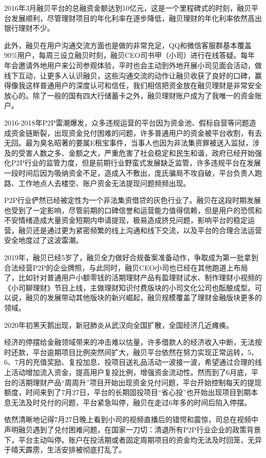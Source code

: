 \documentclass[
]{book}
\begin{document}
2016年3月融贝平台的总融资金额达到10亿元，这是一个里程碑式的时刻，融贝平台发展顺利，尽管理财项目的年化利率在逐步降低，融贝理财的年化利率依然高出银行理财不少。

此外，融贝在用户沟通交流方面也是做的非常充足，QQ和微信客服群基本覆盖90\%用户，每周三设立融贝时刻，融贝CEO司书甲（小司）进行在线答疑。每年年会邀请外地用户来公司参观体验，平时也会主动到外地开展小司见面会活动，做线下互动，让更多人认识融贝，这些沟通交流的动作让融贝收获了良好的口碑，赢得像我这样普通用户的深度认可和信任，我们相信把资金放在融贝理财是非常安全放心的。除了一般的国有四大行储蓄卡之外，融贝理财账户成为了我唯一的资金账户。

2016-2018年P2P雷潮爆发，众多违规运营的平台因为资金池、假标自营等问题造成资金链断裂，出现资金兑付困难的问题，许多普通用户的资金被平台收割，有去无回。最为臭名昭著的要属E租宝事件，当事人也因为非法集资罪被送入监狱，涉及的受害人数之多、金额之大，严重危害了社会稳定和民生和谐，政府已经开始强化P2P行业的监管力度，但是前期行业野蛮式发展缺乏监管，许多违规平台在发展一段时间后因为吸纳资金不足，造成入不敷出，庞氏骗局不攻自破，平台负责人跑路、工作地点人去楼空、账户资金无法提现问题频频出现。

P2P行业俨然已经被定性为一个非法集资借贷的灰色行业了。融贝在这段时期发展也受到了一定影响，尽管前期的口碑信誉和运营能力值得信赖，但是用户的恐慌和不安情绪造成大量资金短期内申请提现，极易造成挤兑问题，影响平台的稳定运营，融贝还是通过更为紧密频繁的线上沟通和线下交流，以及平台的合理合法运营安全地度过了这波雷潮。

2019年，融贝已经5岁了，融贝全力做好合规备案准备动作，争取成为第一批拿到合法经营P2P的企业牌照，与此同时，融贝CEO小司也已经在其他跑道上布局了，比如针对普通用户小额零钱的活期理财产品有盈理财试水、制作理财小视频的《小司聊理财》节目上线，主做理财知识付费版块的小司文化公司也酝酿成型。可以说，融贝的发展带动其他版块的新兴崛起，融贝规模覆盖了理财金融版块更多的领域。

2020年初黑天鹅出现，新冠肺炎从武汉向全国扩散，全国经济几近瘫痪。

经济的停摆给金融领域带来的冲击难以估量，许多借款人的经济收入中断，无法按时还款，平台逾期项目比例突然间扩大，融贝平台依然在努力实现正常运转，5、6、7月的充值奖励、复投加息、投项目送礼品活动一波接一波，希望通过合理的线上活动增加流入资金，提高用户复投比例，增强资金流动性。然而到了6月底，平台的活期理财产品``周周升''项目开始出现资金兑付问题，平台开始控制每天的提现额度，时间来到了7月27日，平台的长期固投项目``省心投''也开始出现项目到期本息无法及时兑付的问题，平台紧急叫停，融贝在走过6年多的时间后陷入停摆。

依然清晰地记得7月27日晚上看到小司的视频直播后的错愕和震惊，司总在视频中声明融贝遇到了兑付困难问题，在国家一刀切：清退所有P2P行业企业的政策背景下，平台主动叫停。账户在投活期或者固定周期项目的资金均无法及时回笼，无异于晴天霹雳，生活安排被彻底打乱了。
\end{document}
